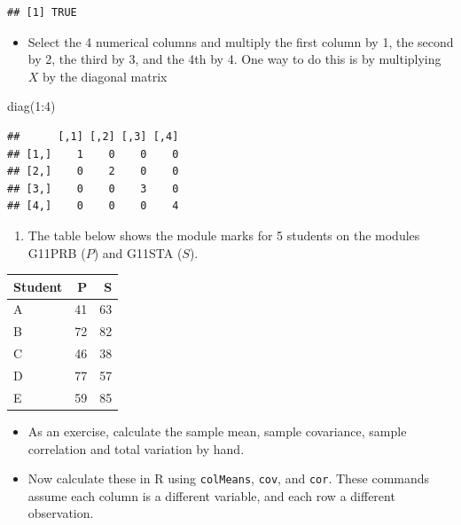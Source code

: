 \documentclass[
]{book}
\newenvironment{Shaded}{\begin{snugshade}}{\end{snugshade}}
\newcommand{\DecValTok}[1]{\textcolor[rgb]{0.00,0.00,0.81}{#1}}
\newcommand{\FunctionTok}[1]{\textcolor[rgb]{0.00,0.00,0.00}{#1}}
\newcommand{\NormalTok}[1]{#1}
\newcommand{\SpecialCharTok}[1]{\textcolor[rgb]{0.00,0.00,0.00}{#1}}
\providecommand{\tightlist}{%
  \setlength{\itemsep}{0pt}\setlength{\parskip}{0pt}}
\theoremstyle{definition}
\theoremstyle{definition}
\theoremstyle{definition}
\theoremstyle{definition}
\theoremstyle{remark}
\begin{document}
\begin{verbatim}
## [1] TRUE
\end{verbatim}

\begin{itemize}
\tightlist
\item
  Select the 4 numerical columns and multiply the first column by 1, the second by 2, the third by 3, and the 4th by 4. One way to do this is by multiplying \(X\) by the diagonal matrix
\end{itemize}

\begin{Shaded}
\begin{Highlighting}[]
\FunctionTok{diag}\NormalTok{(}\DecValTok{1}\SpecialCharTok{:}\DecValTok{4}\NormalTok{)}
\end{Highlighting}
\end{Shaded}

\begin{verbatim}
##      [,1] [,2] [,3] [,4]
## [1,]    1    0    0    0
## [2,]    0    2    0    0
## [3,]    0    0    3    0
## [4,]    0    0    0    4
\end{verbatim}

\begin{enumerate}
\def\labelenumi{\arabic{enumi}.}
\setcounter{enumi}{1}
\tightlist
\item
  The table below shows the module marks for 5 students on the modules G11PRB (\(P\)) and G11STA (\(S\)).
\end{enumerate}

\begin{table}
\centering
\begin{tabular}{lrr}
\toprule
Student & P & S\\
\midrule
A & 41 & 63\\
B & 72 & 82\\
C & 46 & 38\\
D & 77 & 57\\
E & 59 & 85\\
\bottomrule
\end{tabular}
\end{table}

\begin{itemize}
\tightlist
\item
  As an exercise, calculate the sample mean, sample covariance, sample correlation and total variation by hand.
\end{itemize}

\begin{itemize}
\tightlist
\item
  Now calculate these in R using \texttt{colMeans}, \texttt{cov}, and \texttt{cor}. These commands assume each column is a different variable, and each row a different observation.
\end{itemize}
\end{document}
